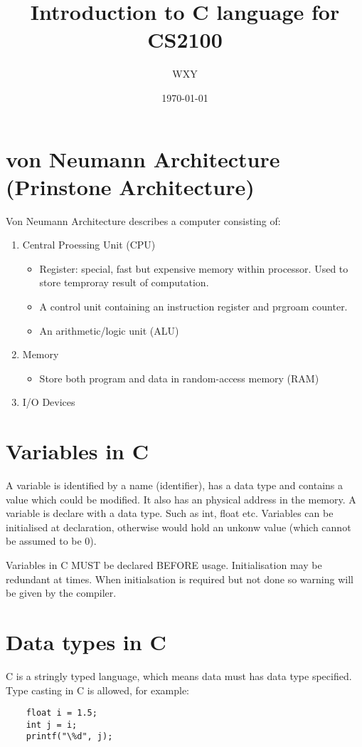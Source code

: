 \documentclass[12pt]{article} %
\title{Introduction to C language for CS2100}
\author{WXY}
\date{\today}
\begin{document}
\maketitle

\tableofcontents %

\section{von Neumann Architecture (Prinstone Architecture)}
Von Neumann Architecture describes a computer consisting of:
\begin{enumerate}
    \item Central Proessing Unit (CPU) 
    \begin{itemize}
        \item Register: special, fast but expensive memory within processor. Used to store temproray result of computation. 
        \item A control unit containing an instruction register and prgroam counter.
        \item An arithmetic/logic unit (ALU)
    \end{itemize}
    \item Memory
    \begin{itemize}
        \item Store both program and data in random-access memory (RAM)
    \end{itemize}
    \item I/O Devices
\end{enumerate}
\section{Variables in C}
A variable is identified by a name (identifier), has a data type and contains a value which could be modified. It also has an physical address in the memory.
A variable is declare with a data type. Such as int, float etc.
Variables can be initialised at declaration, otherwise would hold an unkonw value (which cannot be assumed to be 0).

Variables in C MUST be declared BEFORE usage.
Initialisation may be redundant at times. When initialsation is required but not done so warning will be given by the compiler.

\section {Data types in C}
C is a stringly typed language, which means data must has data type specified.
Type casting in C is allowed, for example:
\begin{lstlisting}
    float i = 1.5;
    int j = i;
    printf("\%d", j);
\end{lstlisting}
\end{document}
